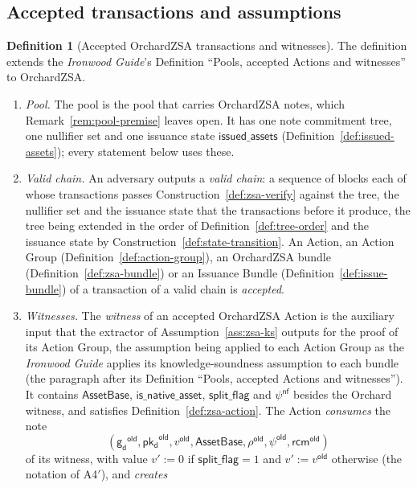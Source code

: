 \documentclass[11pt,a4paper]{article}
\theoremstyle{definition}
\newtheorem{definition}[theorem]{Definition}
\newcommand{\pkd}{\ensuremath{\mathsf{pk_d}}}
\newcommand{\gd}{\ensuremath{\mathsf{g_d}}}
\newcommand{\rcm}{\ensuremath{\mathsf{rcm}}}
\begin{document}
\subsection{Accepted transactions and assumptions}\label{sec:security-model}

\begin{definition}[Accepted OrchardZSA transactions and witnesses]
\label{def:zsa-accepted}
The definition extends the \emph{Ironwood Guide}'s Definition ``Pools,
accepted Actions and witnesses'' to OrchardZSA.
\begin{enumerate}
\item[(a)] \emph{Pool.} The pool is the pool that carries OrchardZSA notes,
  which Remark~\ref{rem:pool-premise} leaves open. It has one note
  commitment tree, one nullifier set and one issuance state
  $\mathsf{issued\_assets}$ (Definition~\ref{def:issued-assets}); every
  statement below uses these.
\item[(b)] \emph{Valid chain.} An adversary outputs a \emph{valid chain}: a
  sequence of blocks each of whose transactions passes
  Construction~\ref{def:zsa-verify} against the tree, the nullifier set and
  the issuance state that the transactions before it produce, the tree
  being extended in the order of Definition~\ref{def:tree-order} and the
  issuance state by Construction~\ref{def:state-transition}. An Action, an
  Action Group (Definition~\ref{def:action-group}), an OrchardZSA bundle
  (Definition~\ref{def:zsa-bundle}) or an Issuance Bundle
  (Definition~\ref{def:issue-bundle}) of a transaction of a valid chain is
  \emph{accepted}.
\item[(c)] \emph{Witnesses.} The \emph{witness} of an accepted OrchardZSA
  Action is the auxiliary input that the extractor of
  Assumption~\ref{ass:zsa-ks} outputs for the proof of its Action Group,
  the assumption being applied to each Action Group as the \emph{Ironwood
  Guide} applies its knowledge-soundness assumption to each bundle (the
  paragraph after its Definition ``Pools, accepted Actions and
  witnesses''). It contains $\mathsf{AssetBase}$,
  $\mathsf{is\_native\_asset}$, $\mathsf{split\_flag}$ and
  $\psi^{\mathsf{nf}}$ besides the Orchard witness, and satisfies
  Definition~\ref{def:zsa-action}. The Action \emph{consumes} the note
  \[
    (\gd^{\mathsf{old}}, \pkd^{\mathsf{old}}, v^{\mathsf{old}},
    \mathsf{AssetBase}, \rho^{\mathsf{old}}, \psi^{\mathsf{old}},
    \rcm^{\mathsf{old}})
  \]
  of its witness, with value $v' := 0$ if $\mathsf{split\_flag} = 1$ and
  $v' := v^{\mathsf{old}}$ otherwise (the notation of A4$'$), and \emph{creates}

\end{enumerate}
\end{definition}
\end{document}
